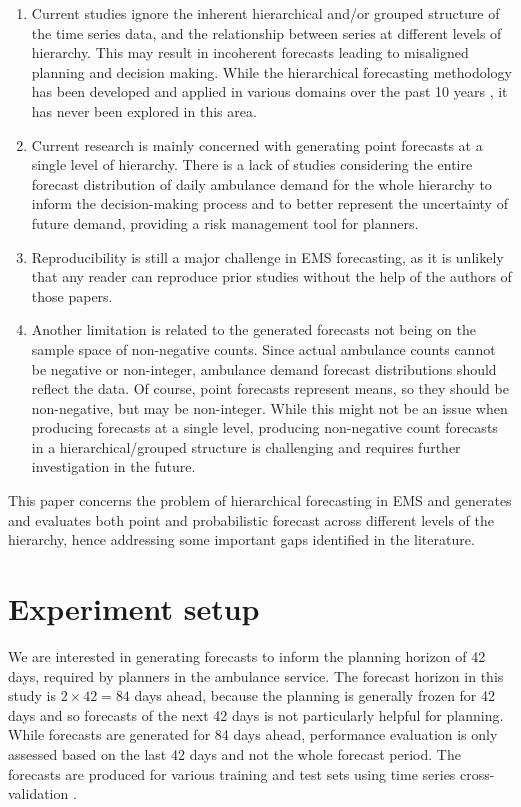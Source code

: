 \documentclass[
  authoryear,
  preprint,
  3p]{elsarticle}
\begin{document}
\begin{enumerate}
\def\labelenumi{\arabic{enumi}.}
\item
  Current studies ignore the inherent hierarchical and/or grouped
  structure of the time series data, and the relationship between series
  at different levels of hierarchy. This may result in incoherent
  forecasts leading to misaligned planning and decision making. While
  the hierarchical forecasting methodology has been developed and
  applied in various domains over the past 10 years
  \citep{panagiotelis2022probabilistic}, it has never been explored in
  this area.
\item
  Current research is mainly concerned with generating point forecasts
  at a single level of hierarchy. There is a lack of studies considering
  the entire forecast distribution of daily ambulance demand for the
  whole hierarchy to inform the decision-making process and to better
  represent the uncertainty of future demand, providing a risk
  management tool for planners.
\item
  Reproducibility is still a major challenge in EMS forecasting, as it
  is unlikely that any reader can reproduce prior studies without the
  help of the authors of those papers.
\item
  Another limitation is related to the generated forecasts not being on
  the sample space of non-negative counts. Since actual ambulance counts
  cannot be negative or non-integer, ambulance demand forecast
  distributions should reflect the data. Of course, point forecasts
  represent means, so they should be non-negative, but may be
  non-integer. While this might not be an issue when producing forecasts
  at a single level, producing non-negative count forecasts in a
  hierarchical/grouped structure is challenging and requires further
  investigation in the future.
\end{enumerate}

This paper concerns the problem of hierarchical forecasting in EMS and
generates and evaluates both point and probabilistic forecast across
different levels of the hierarchy, hence addressing some important gaps
identified in the literature.

\hypertarget{sec-experiment}{%
\section{Experiment setup}\label{sec-experiment}}

We are interested in generating forecasts to inform the planning horizon
of 42 days, required by planners in the ambulance service. The forecast
horizon in this study is \(2 \times 42 = 84\) days ahead, because the
planning is generally frozen for 42 days and so forecasts of the next 42
days is not particularly helpful for planning. While forecasts are
generated for 84 days ahead, performance evaluation is only assessed
based on the last 42 days and not the whole forecast period. The
forecasts are produced for various training and test sets using time
series cross-validation \citep{hyndman2021forecasting}.
\end{document}
